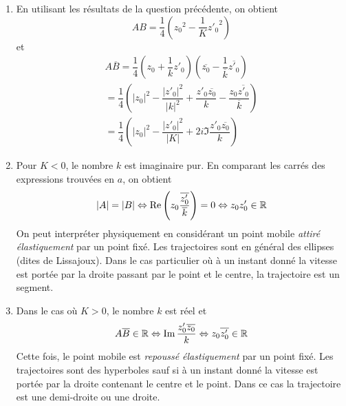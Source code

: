 \begin{enumerate}
\begin{enumerate}
 \item En utilisant les résultats de la question précédente, on obtient
\begin{displaymath}
 AB = \dfrac{1}{4}\left( {z_0}^2 - \dfrac{1}{K}{z'_0}^2\right) 
\end{displaymath}
et
\begin{multline*}
 A\overline{B} = \dfrac{1}{4}\left( z_0 + \dfrac{1}{k}z'_0\right)\left( \overline{z_0} - \dfrac{1}{\overline{k}}\overline{z'_0}\right)\\
= \dfrac{1}{4}\left( |z_0|^2 - \dfrac{|z'_0|^2}{|k|^2} 
+ \dfrac{z'_0 \overline{z_0}}{k} - \dfrac{z_0 \overline {z'_0}}{\overline{k}} \right)\\
= \dfrac{1}{4}\left( |z_0|^2 - \dfrac{|z'_0|^2}{|K|} +2i \Im\dfrac{z'_0 \overline{z_0}}{k} \right) 
\end{multline*}

 \item Pour $K<0$, le nombre $k$ est imaginaire pur. En comparant les carrés des expressions trouvées en $a$, on obtient 
\begin{displaymath}
 |A|=|B| \Leftrightarrow \operatorname{Re}\left( z_0\dfrac{\overline{z'_0}}{\overline{k}}\right)=0 
\Leftrightarrow z_0z'_0\in \mathbb{R} 
\end{displaymath}
On peut interpréter physiquement en considérant un point mobile \emph{attiré élastiquement} par un point fixé. Les trajectoires sont en général des ellipses (dites de Lissajoux). Dans le cas particulier où à un instant donné la vitesse est portée par la droite passant par le point et le centre, la trajectoire est un segment. 

 \item Dans le cas où $K>0$, le nombre $k$ est réel et
\begin{displaymath}
A\overline{B}\in \mathbb{R} \Leftrightarrow \operatorname{Im}\dfrac{z'_0 \overline{z_0}}{k}
\Leftrightarrow z_0\overline{z'_0}\in \mathbb{R} 
\end{displaymath}
Cette fois, le point mobile est \emph{repoussé élastiquement} par un point fixé. Les trajectoires sont des hyperboles sauf si à un instant donné la vitesse est portée par la droite contenant le centre et le point. Dans ce cas la trajectoire est une demi-droite ou une droite.
\end{enumerate}

\end{enumerate}



